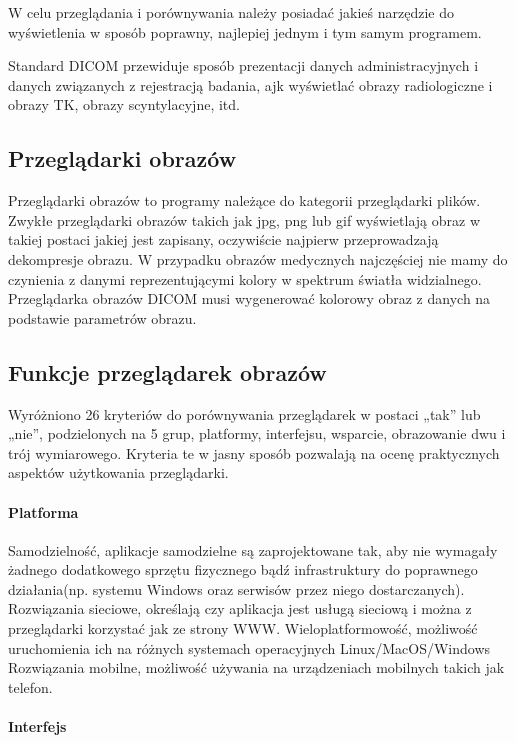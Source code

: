 
\par
W celu przeglądania i porównywania należy posiadać jakieś narzędzie do wyświetlenia w sposób poprawny, najlepiej jednym i tym samym programem.
\par
Standard DICOM przewiduje sposób prezentacji danych administracyjnych i danych związanych z rejestracją badania, ajk wyświetlać obrazy radiologiczne i obrazy TK, obrazy scyntylacyjne, itd.

\subsection{Przeglądarki obrazów}

Przeglądarki obrazów to programy należące do kategorii przeglądarki plików.
Zwykłe przeglądarki obrazów takich jak jpg, png lub gif wyświetlają obraz w takiej postaci jakiej jest zapisany, oczywiście najpierw przeprowadzają dekompresje obrazu.
W przypadku obrazów medycznych najczęściej nie mamy do czynienia z danymi reprezentującymi kolory w spektrum światła widzialnego.
Przeglądarka obrazów DICOM musi wygenerować kolorowy obraz z danych na podstawie parametrów obrazu.

\subsection{Funkcje przeglądarek obrazów}

Wyróżniono 26 kryteriów do porównywania przeglądarek w postaci „tak” lub „nie”, podzielonych na 5 grup, platformy, interfejsu, wsparcie, obrazowanie dwu i trój wymiarowego.
Kryteria te w jasny sposób pozwalają na ocenę praktycznych aspektów użytkowania przeglądarki.

\paragraph{Platforma}

Samodzielność, aplikacje samodzielne są zaprojektowane tak, aby nie wymagały żadnego dodatkowego sprzętu fizycznego bądź infrastruktury do poprawnego działania(np. systemu Windows oraz serwisów przez niego dostarczanych).
Rozwiązania sieciowe, określają czy aplikacja jest usługą sieciową i można z przeglądarki korzystać jak ze strony WWW.
Wieloplatformowość, możliwość uruchomienia ich na różnych systemach operacyjnych Linux/MacOS/Windows
Rozwiązania mobilne, możliwość używania na urządzeniach mobilnych takich jak telefon.

\paragraph{Interfejs}

